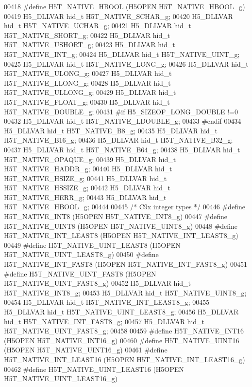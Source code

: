 \begin{DoxyCode}
00418 \textcolor{preprocessor}{#define H5T\_NATIVE\_HBOOL    (H5OPEN H5T\_NATIVE\_HBOOL\_g)}
00419 H5\_DLLVAR hid\_t H5T\_NATIVE\_SCHAR\_g;
00420 H5\_DLLVAR hid\_t H5T\_NATIVE\_UCHAR\_g;
00421 H5\_DLLVAR hid\_t H5T\_NATIVE\_SHORT\_g;
00422 H5\_DLLVAR hid\_t H5T\_NATIVE\_USHORT\_g;
00423 H5\_DLLVAR hid\_t H5T\_NATIVE\_INT\_g;
00424 H5\_DLLVAR hid\_t H5T\_NATIVE\_UINT\_g;
00425 H5\_DLLVAR hid\_t H5T\_NATIVE\_LONG\_g;
00426 H5\_DLLVAR hid\_t H5T\_NATIVE\_ULONG\_g;
00427 H5\_DLLVAR hid\_t H5T\_NATIVE\_LLONG\_g;
00428 H5\_DLLVAR hid\_t H5T\_NATIVE\_ULLONG\_g;
00429 H5\_DLLVAR hid\_t H5T\_NATIVE\_FLOAT\_g;
00430 H5\_DLLVAR hid\_t H5T\_NATIVE\_DOUBLE\_g;
00431 \textcolor{preprocessor}{#if H5\_SIZEOF\_LONG\_DOUBLE !=0}
00432 H5\_DLLVAR hid\_t H5T\_NATIVE\_LDOUBLE\_g;
00433 \textcolor{preprocessor}{#endif}
00434 H5\_DLLVAR hid\_t H5T\_NATIVE\_B8\_g;
00435 H5\_DLLVAR hid\_t H5T\_NATIVE\_B16\_g;
00436 H5\_DLLVAR hid\_t H5T\_NATIVE\_B32\_g;
00437 H5\_DLLVAR hid\_t H5T\_NATIVE\_B64\_g;
00438 H5\_DLLVAR hid\_t H5T\_NATIVE\_OPAQUE\_g;
00439 H5\_DLLVAR hid\_t H5T\_NATIVE\_HADDR\_g;
00440 H5\_DLLVAR hid\_t H5T\_NATIVE\_HSIZE\_g;
00441 H5\_DLLVAR hid\_t H5T\_NATIVE\_HSSIZE\_g;
00442 H5\_DLLVAR hid\_t H5T\_NATIVE\_HERR\_g;
00443 H5\_DLLVAR hid\_t H5T\_NATIVE\_HBOOL\_g;
00444 
00445 \textcolor{comment}{/* C9x integer types */}
00446 \textcolor{preprocessor}{#define H5T\_NATIVE\_INT8         (H5OPEN H5T\_NATIVE\_INT8\_g)}
00447 \textcolor{preprocessor}{#define H5T\_NATIVE\_UINT8        (H5OPEN H5T\_NATIVE\_UINT8\_g)}
00448 \textcolor{preprocessor}{#define H5T\_NATIVE\_INT\_LEAST8       (H5OPEN H5T\_NATIVE\_INT\_LEAST8\_g)}
00449 \textcolor{preprocessor}{#define H5T\_NATIVE\_UINT\_LEAST8      (H5OPEN H5T\_NATIVE\_UINT\_LEAST8\_g)}
00450 \textcolor{preprocessor}{#define H5T\_NATIVE\_INT\_FAST8        (H5OPEN H5T\_NATIVE\_INT\_FAST8\_g)}
00451 \textcolor{preprocessor}{#define H5T\_NATIVE\_UINT\_FAST8       (H5OPEN H5T\_NATIVE\_UINT\_FAST8\_g)}
00452 H5\_DLLVAR hid\_t H5T\_NATIVE\_INT8\_g;
00453 H5\_DLLVAR hid\_t H5T\_NATIVE\_UINT8\_g;
00454 H5\_DLLVAR hid\_t H5T\_NATIVE\_INT\_LEAST8\_g;
00455 H5\_DLLVAR hid\_t H5T\_NATIVE\_UINT\_LEAST8\_g;
00456 H5\_DLLVAR hid\_t H5T\_NATIVE\_INT\_FAST8\_g;
00457 H5\_DLLVAR hid\_t H5T\_NATIVE\_UINT\_FAST8\_g;
00458 
00459 \textcolor{preprocessor}{#define H5T\_NATIVE\_INT16        (H5OPEN H5T\_NATIVE\_INT16\_g)}
00460 \textcolor{preprocessor}{#define H5T\_NATIVE\_UINT16       (H5OPEN H5T\_NATIVE\_UINT16\_g)}
00461 \textcolor{preprocessor}{#define H5T\_NATIVE\_INT\_LEAST16      (H5OPEN H5T\_NATIVE\_INT\_LEAST16\_g)}
00462 \textcolor{preprocessor}{#define H5T\_NATIVE\_UINT\_LEAST16     (H5OPEN H5T\_NATIVE\_UINT\_LEAST16\_g)}

\end{DoxyCode}
